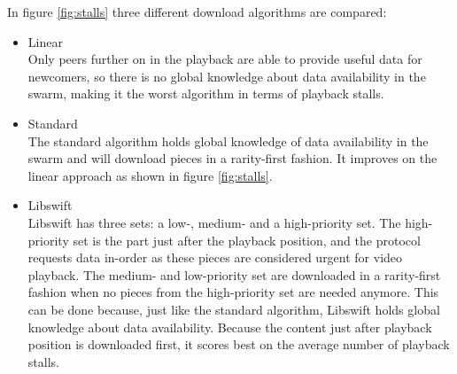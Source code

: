 In figure \ref{fig:stalls} three different download algorithms are compared: 
\begin{itemize}
	\item Linear\\ Only peers further on in the playback are able to provide useful data for newcomers, so there is no global knowledge about data availability in the swarm, making it the worst algorithm in terms of playback stalls.
	\item Standard\\ The standard algorithm holds global knowledge of data availability in the swarm and will download pieces in a rarity-first fashion. It improves on the linear approach as shown in figure \ref{fig:stalls}.
	\item Libswift\\ Libswift has three sets: a low-, medium- and a high-priority set. The high-priority set is the part just after the playback position, and the protocol requests data in-order as these pieces are considered urgent for video playback. The medium- and low-priority set are downloaded in a rarity-first fashion when no pieces from the high-priority set are needed anymore. This can be done because, just like the standard algorithm, Libswift holds global knowledge about data availability. Because the content just after playback position is downloaded first, it scores best on the average number of playback stalls.
\end{itemize}
